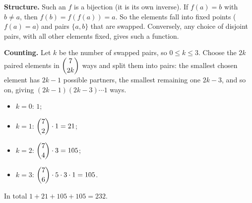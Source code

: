 \textbf{Structure.} Such an $f$ is a bijection (it is its own inverse). If $f(a)=b$ with $b\ne a$, then $f(b)=f(f(a))=a$. So the elements fall into fixed points ($f(a)=a$) and pairs $\{a,b\}$ that are swapped. Conversely, any choice of disjoint pairs, with all other elements fixed, gives such a function.

\textbf{Counting.} Let $k$ be the number of swapped pairs, so $0\le k\le3$. Choose the $2k$ paired elements in $\dbinom{7}{2k}$ ways and split them into pairs: the smallest chosen element has $2k-1$ possible partners, the smallest remaining one $2k-3$, and so on, giving $(2k-1)(2k-3)\cdots1$ ways.
\begin{itemize}
\item $k=0$: $1$;
\item $k=1$: $\dbinom72\cdot1=21$;
\item $k=2$: $\dbinom74\cdot3=105$;
\item $k=3$: $\dbinom76\cdot5\cdot3\cdot1=105$.
\end{itemize}
In total $1+21+105+105=\boxed{232}$.
